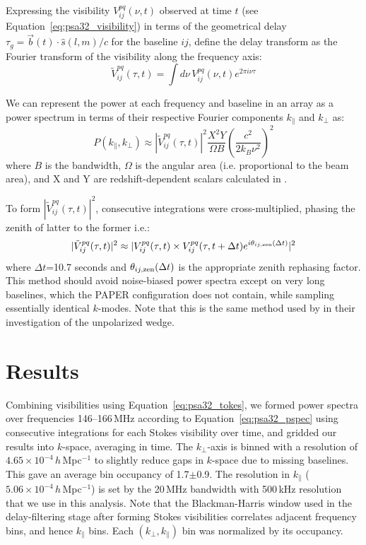Expressing the visibility $V_{ij}^{pq}(\nu,t)$ observed at time $t$ (see Equation~\ref{eq:psa32_visibility}) in terms of the geometrical delay $\tau_g=\vec{b}(t) \cdot \hat{s}(l,m)/c$ for the baseline $ij$, \citet{Parsons.12a} define the delay transform as the Fourier transform of the visibility along the frequency axis:
\begin{equation}
\tilde{V}_{ij}^{pq}(\tau,t) = \int d\nu \, V_{ij}^{pq}(\nu,t) e^{2\pi i \nu \tau}
\end{equation}

We can represent the power at each frequency and baseline in an array as a power spectrum in terms of their respective Fourier components $k_{\parallel}$ and $k_{\perp}$ as:
\begin{equation}
P(k_{\parallel},k_{\perp}) \approx |\tilde{V}_{ij}^{pq}(\tau,t)|^2 \frac{X^2Y}{\Omega B}\left(\frac{c^2}{2k_B\nu^2}\right)^2
\label{eq:psa32_pspec}
\end{equation}
where $B$ is the bandwidth, $\Omega$ is the angular area (i.e. proportional to the beam area), and X and Y are redshift-dependent scalars calculated in \citet{Parsons.12b}. 

To form $|\tilde{V}_{ij}^{pq}(\tau,t)|^2$, consecutive integrations were cross-multiplied, phasing the zenith of latter to the former i.e.:
\begin{equation}
|\tilde{V}_{ij}^{pq}(\tau,t)|^2 \approx |{V}_{ij}^{pq}(\tau,t)\times {V}_{ij}^{pq}(\tau,t+\Delta t)e^{i\theta_{ij,{\rm zen}}(\Delta t)}|^2
\end{equation}
where $\Delta t$=10.7 seconds and $\theta_{ij,{\rm zen}}(\Delta t)$ is the appropriate zenith rephasing factor. This method should avoid noise-biased power spectra except on very long baselines, which the PAPER configuration does not contain, while sampling essentially identical $k$-modes.  Note that this is the same method used by \citet{Pober.13} in their investigation of the unpolarized wedge.

\section{Results}
\label{sec:psa32_res}
Combining visibilities using Equation~\ref{eq:psa32_tokes}, we formed power spectra over frequencies 146--166\,MHz according to Equation~\ref{eq:psa32_pspec} using consecutive integrations for each Stokes visibility over time, and gridded our results into $k$-space, averaging in time. 
The $k_{\perp}$-axis is binned with a resolution of $4.65\times10^{-4}\,h$\,Mpc$^{-1}$ to slightly reduce gaps in $k$-space due to missing baselines. This gave an average bin occupancy of 1.7$\pm$0.9.
The resolution in $k_{\parallel}$ ($5.06\times10^{-4}\,h$\,Mpc$^{-1}$) is set by the 20\,MHz bandwidth with 500\,kHz resolution that we use in this analysis.
Note that the Blackman-Harris window used in the delay-filtering stage after forming Stokes visibilities correlates adjacent frequency bins, and hence $k_{\parallel}$ bins.
Each $(k_{\perp},k_{\parallel})$ bin was normalized by its occupancy.

